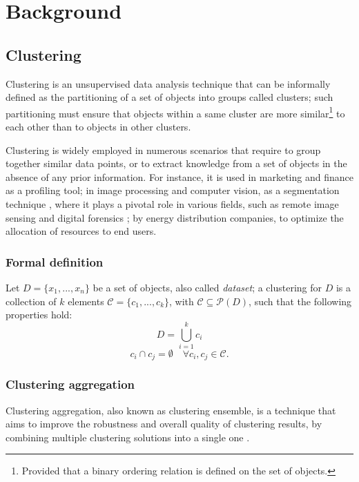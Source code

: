 \newtheorem{postulate}{Postulate}
\chapter{Background}
\label{cha:background}

\section{Clustering}
Clustering is an unsupervised data analysis technique that can be informally defined as the partitioning of a set of objects into groups called clusters; such partitioning must ensure that objects within a same cluster are more similar\footnote{Provided that a binary ordering relation is defined on the set of objects.} to each other than to objects in other clusters. \cite{clustering}

Clustering is widely employed in numerous scenarios that require to group together similar data points, or to extract knowledge from a set of objects in the absence of any prior information. For instance, it is used in marketing and finance as a profiling tool; %
in image processing and computer vision, as a segmentation technique \cite{Gonzalez2017}, where it plays a pivotal role in various fields, such as remote image sensing \cite{remote-sensing} and digital forensics \cite{forensics}; %
by energy distribution companies, to optimize the allocation of resources to end users. %

\subsection{Formal definition}
Let $D = \{x_{1},...,x_{n}\}$ be a set of objects, also called \textit{dataset}; a clustering for $D$ is a collection of $k$ elements $\mathcal{C} =\{c_{1},...,c_{k}\}$, with $\mathcal{C} \subseteq \mathcal{P}(D)$, such that the following properties hold:
\begin{equation}
    \label{eqn:union}
    D = \bigcup_{i=1}^{k} c_{i}
\end{equation}
\begin{equation}
    \label{eqn:overlap}
    c_{i} \cap c_{j} = \emptyset \quad \forall c_{i}, c_{j} \in \mathcal{C}.
\end{equation}

\subsection{Clustering aggregation}
Clustering aggregation, also known as clustering ensemble, is a technique that aims to improve the robustness and overall quality of clustering results, by combining multiple clustering solutions into a single one \cite{vega2011survey}. 

